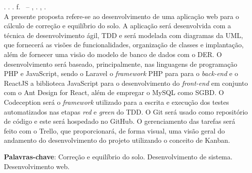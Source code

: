 
\begin{resumo}[RESUMO]
\begin{SingleSpacing}

\imprimirautorcitacao. \imprimirtitulo. \imprimirdata. \pageref {LastPage} f. \imprimirprojeto\ – \imprimirprograma, \imprimirinstituicao. \imprimirlocal, \imprimirdata.\\

A presente proposta refere-se ao desenvolvimento de uma aplicação web para o cálculo de correção e equilíbrio do solo. A aplicação será desenvolvida com a técnica de desenvolvimento ágil, TDD e será modelada com diagramas da UML, que fornecerá as visões de funcionalidades, organização de classes e implantação, além de fornecer uma visão do modelo de banco de dados com o DER. O desenvolvimento será baseado, principalmente, nas linguagens de programação PHP e JavaScript, sendo o Laravel o \textit{framework} PHP para para o \textit{back-end} e o ReactJS a biblioteca JavaScript para o desenvolvimento do \textit{front-end} em conjunto com o Ant Design for React, além de empregar o MySQL como SGBD. O Codeception será o \textit{framework} utilizado para a escrita e execução dos testes automatizados nas etapas \textit{red} e \textit{green} do TDD. O Git será usado como repositório de código e este será hospedado no GitHub. O gerenciamento das tarefas será feito com o Trello, que proporcionará, de forma visual, uma visão geral do andamento do desenvolvimento do projeto utilizando o conceito de Kanban.

\textbf{Palavras-chave}: Correção e equilíbrio do solo. Desenvolvimento de sistema. Desenvolvimento web.

\end{SingleSpacing}
\end{resumo}

